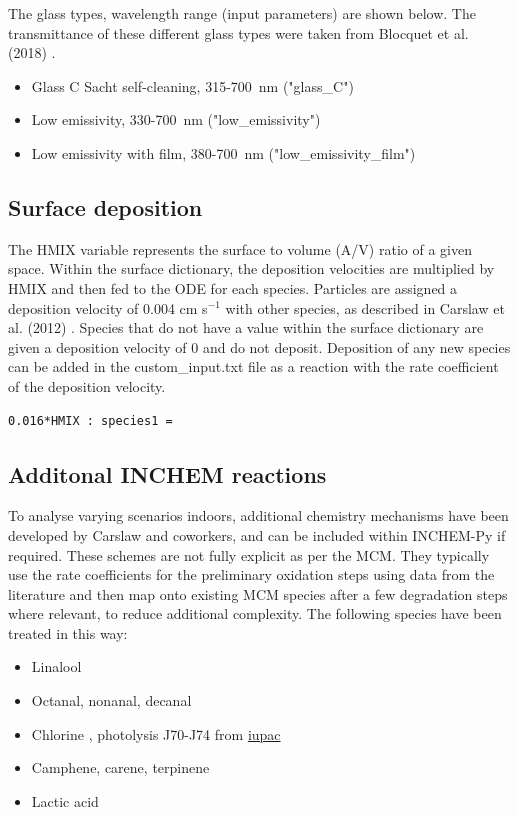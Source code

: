 \documentclass[a4paper]{refart}
\begin{document}
The glass types, wavelength range (input parameters) are shown below. The transmittance of these different glass types were taken from Blocquet et al. (2018) \cite{Blocquet2018}.
\begin{itemize}
    \item Glass C Sacht self-cleaning, 315-700~nm ("glass\_C")
    \item Low emissivity, 330-700~nm ("low\_emissivity")
    \item Low emissivity with film, 380-700~nm ("low\_emissivity\_film")
\end{itemize}

\subsection{Surface deposition}\label{surface_dictionary.py}
The HMIX variable represents the surface to volume (A/V) ratio of a given space. Within the surface dictionary, the deposition velocities are multiplied by HMIX and then fed to the ODE for each species. Particles are assigned a deposition velocity of 0.004 cm s$^{-1}$ with other species, as described in Carslaw et al. (2012) \cite{Carslaw2012}. Species that do not have a value within the surface dictionary are given a deposition velocity of 0 and do not deposit. Deposition of any new species can be added in the custom\_input.txt file as a reaction with the rate coefficient of the deposition velocity. 
\begin{verbatim}
0.016*HMIX : species1 =
\end{verbatim}


\subsection{Additonal INCHEM reactions}\label{inchem_chemistry}
To analyse varying scenarios indoors, additional chemistry mechanisms have been developed by Carslaw and coworkers, and can be included within INCHEM-Py if required. These schemes are not fully explicit as per the MCM. They typically use the rate coefficients for the preliminary oxidation steps using data from the literature and then map onto existing MCM species after a few degradation steps where relevant, to reduce additional complexity. The following species have been treated in this way:
\begin{itemize}
    \item Linalool \cite{Carslaw2017}
    \item Octanal, nonanal, decanal \cite{Kruza2017}
    \item Chlorine \cite{Xue2015,Wong2017,Wang2020}, photolysis J70-J74 from \href{http://iupac.pole-ether.fr}{iupac}
    \item Camphene, carene, terpinene \cite{Carslaw2007}
    \item Lactic acid
\end{itemize}
\end{document}
